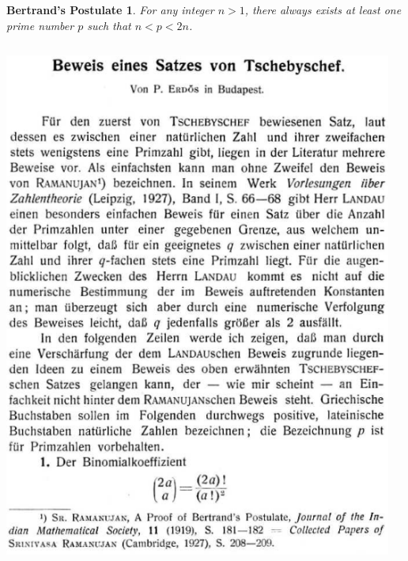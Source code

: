 \documentclass{beamer}
\newtheorem{pos}{Bertrand's Postulate}
\begin{document}
\begin{frame}

\begin{pos}
\normalfont For any integer $n > 1$, there always exists at least one prime number $p$ such that $ n < p < 2n$.
\end{pos}
\begin{columns}[onlytextwidth,T]
\column{\dimexpr\linewidth-60mm-5mm}\begin{center}
\includegraphics[scale = .30]{proof_german}
\end{center}
\column{\dimexpr\linewidth-60mm-5mm}\begin{center}

\end{center}
\end{columns}
\end{frame}
\end{document}
